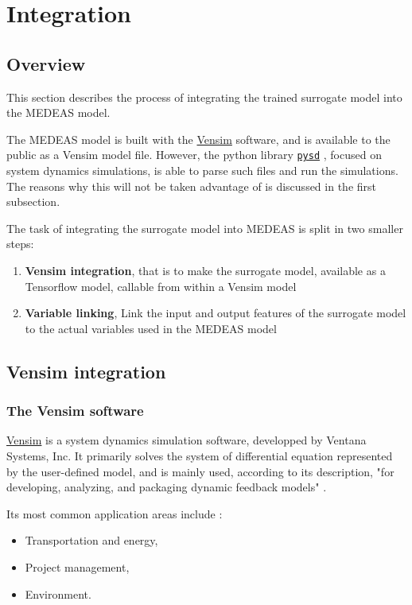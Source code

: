 \section{Integration}

\subsection{Overview}

This section describes the process of integrating the trained surrogate model into the MEDEAS model.

The MEDEAS model is built with the \href{https://vensim.com/}{Vensim} software, and is available to the public as a Vensim model file. However, the python library \href{https://pysd.readthedocs.io/en/master/index.html}{\texttt{pysd}} \cite{pysd}, focused on system dynamics simulations, is able to parse such files and run the simulations. The reasons why this will not be taken advantage of is discussed in the first subsection.

The task of integrating the surrogate model into MEDEAS is split in two smaller steps:
\begin{enumerate}
    \item \textbf{Vensim integration}, that is to make the surrogate model, available as a Tensorflow model, callable from within a Vensim model
    \item \textbf{Variable linking}, Link the input and output features of the surrogate model to the actual variables used in the MEDEAS model
\end{enumerate}

\subsection{Vensim integration}

\subsubsection{The Vensim software}

\href{https://vensim.com/}{Vensim} is a system dynamics simulation software, developped by Ventana Systems, Inc. It primarily solves the system of differential equation represented by the user-defined model, and is mainly used, according to its description, "for developing, analyzing, and packaging dynamic feedback models" \cite{vensim-website}.

Its most common application areas include \cite{wiki-vensim}:
\begin{itemize}
    \item Transportation and energy,
    \item Project management,
    \item Environment.
\end{itemize}

